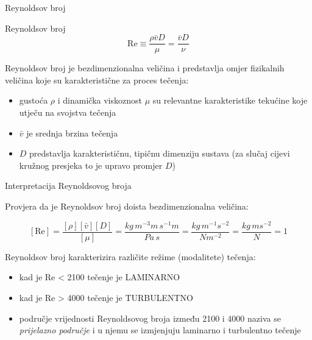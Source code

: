 \documentclass[croatian]{beamer}
\begin{document}
\begin{frame}{Reynoldsov broj}

\begin{definition}
Reynoldsov broj
\[
\mathrm{Re}\equiv\frac{\rho\bar{v}D}{\mu}=\frac{\bar{v}D}{\nu}
\]
\end{definition}

Reynoldsov broj je \alert{bezdimenzionalna veličina} i predstavlja
omjer fizikalnih veličina koje su karakteristične za proces tečenja:
\begin{itemize}
\item gustoća $\rho$ i dinamička viskoznost $\mu$ su relevantne karakteristike
tekućine koje utječu na svojstva tečenja
\item $\bar{v}$ je srednja brzina tečenja
\item $D$ predstavlja karakterističnu, tipičnu dimenziju sustava (za slučaj
cijevi kružnog presjeka to je upravo promjer $D$)
\end{itemize}
\end{frame}

\begin{frame}{Interpretacija Reynoldsovog broja}

Provjera da je Reynoldsov broj doista bezdimenzionalna veličina:

\[
[\mathrm{Re}]=\frac{[\rho][\bar{v}][D]}{[\mu]}=\frac{kg\,m^{-3}m\,s^{-1}m}{Pa\,s}=\frac{kg\,m^{-1}s^{-2}}{Nm^{-2}}=\frac{kg\,ms^{-2}}{N}=1
\]

\begin{alertblock}{Reynoldsov broj karakterizira različite režime (modalitete) tečenja:}

\begin{itemize}
\item kad je Re < 2100 tečenje je LAMINARNO
\item kad je Re > 4000 tečenje je TURBULENTNO
\end{itemize}
\end{alertblock}
\begin{itemize}
\item područje vrijednosti Reynoldsovog broja između 2100 i 4000 naziva
se \emph{prijelazno područje} i u njemu se izmjenjuju laminarno i
turbulentno tečenje
\end{itemize}
\end{frame}
\end{document}
